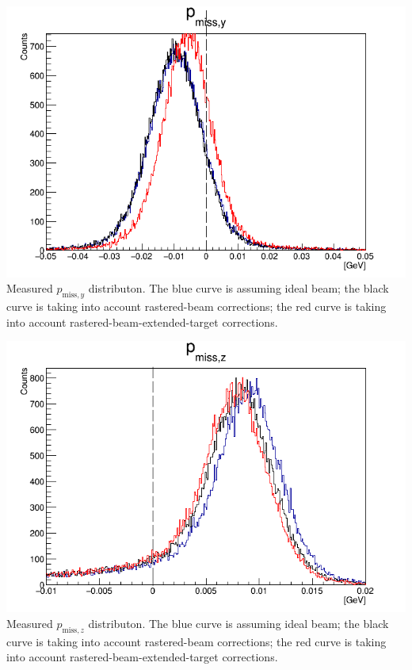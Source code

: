 \documentclass{article}
\begin{document}
\begin{center}
\includegraphics[width=14cm]{Pmy.png}\\
Measured $p_{\textrm{miss},y}$ distributon. The blue curve is assuming ideal beam; the black curve is taking into account rastered-beam corrections; the red curve is taking into account rastered-beam-extended-target corrections.
\end{center}

\begin{center}
\includegraphics[width=14cm]{Pmz.png}\\
Measured $p_{\textrm{miss},z}$ distributon. The blue curve is assuming ideal beam; the black curve is taking into account rastered-beam corrections; the red curve is taking into account rastered-beam-extended-target corrections.
\end{center}
\end{document}

